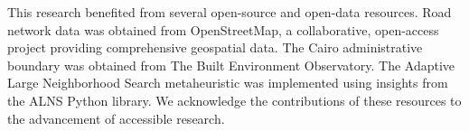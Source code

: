 \documentclass[journal]{IEEEtran}
\begin{document}
This research benefited from several open-source and open-data resources. Road network data was obtained from OpenStreetMap, a collaborative, open-access project providing comprehensive geospatial data. The Cairo administrative boundary was obtained from The Built Environment Observatory. The Adaptive Large Neighborhood Search metaheuristic was implemented using insights from the ALNS Python library. We acknowledge the contributions of these resources to the advancement of accessible research.




\end{document}
